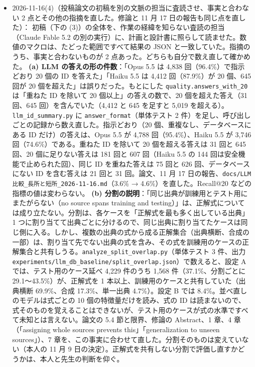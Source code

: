 \documentclass[11pt,a4paper]{jsarticle}
\begin{document}
\begin{itemize}[nosep]
  \item 2026-11-16(4)（投稿論文の初稿を別の文脈の担当に査読させ、事実と合わない 2 点とその他の指摘を直した。修論と 11 月 17 日の報告も同じ点を直した）：
    初稿（下の (3)）の全体を、作業の経緯を知らない査読の担当（Claude Fable 5.2 の別の実行）に、計画と設計書に照らして読ませた。数値のマクロは、たどった範囲ですべて結果の JSON と一致していた。指摘のうち、事実と合わないものが 2 点あった。どちらも自分で数え直して確かめた。
    \textbf{(a) LLM の答えの形の件数}：「Opus 5.5 は 4,838 回（96.4\%）で指示どおり 20 個の ID を答えた」「Haiku 5.5 は 4,412 回（87.9\%）が 20 個、645 回が 20 個を超えた」は誤りだった。もとにした \texttt{quality.answers\_with\_20} は「重ねた ID を除いて 20 個以上」の答えの数で、20 個を超えた答え（31 回、645 回）を含んでいた（4,412 と 645 を足すと 5,019 を超える）。\texttt{llm\_id\_summary.py} に \texttt{answer\_format}（単体テスト 2 件）を足し、呼び出しごとの記録から数え直した。指示どおり（20 個、重複なし、データベースにある ID だけ）の答えは、Opus 5.5 が 4,788 回（95.4\%）、Haiku 5.5 が 3,746 回（74.6\%）である。重ねた ID を除いて 20 個を超える答えは 31 回と 645 回、20 個に足りない答えは 181 回と 607 回（Haiku 5.5 の 144 回は安全機能で止められた回）、同じ ID を重ねた答えは 75 回と 626 回、データベースにない ID を含む答えは 21 回と 31 回。論文、11 月 17 日の報告、\texttt{docs/LLM比較\_長所と短所\_2026-11-16.md}（3.6\% → 4.6\%）を直した。Recall@20 などの指標の値は変わらない。
    \textbf{(b) 分割の説明}：「同じ出典が訓練用とテスト用にまたがらない（no source spans training and testing）」は、正解式については成り立たない。分割は、各ケースを「正解式を最も多く出している出典」1 つに割り当てて出典ごとに分けるので、同じ出典に割り当てたケースは同じ側に入る。しかし、複数の出典の式から成る正解集合（出典横断、合成の一部）は、割り当て先でない出典の式を含み、その式を訓練用のケースの正解集合と共有しうる。\texttt{analyze\_split\_overlap.py}（単体テスト 3 件、出力 \texttt{experiments/llm\_db\_baseline/split\_overlap.json}）で数えると、設定 A では、テスト用のケース延べ 4,229 件のうち 1,568 件（37.1\%、分割ごとに 29.1〜43.5\%）が、正解式を 1 本以上、訓練用のケースと共有していた（出典横断 69.9\%、合成 17.3\%、単一出典 4.7\%）。設定 B では 8.4\%。並べ直しのモデルは式ごとの 10 個の特徴量だけを読み、式の ID は読まないので、式そのものを覚えることはできないが、テスト用のケースが式の水準ですべて未知とは言えない。論文の 5.4 節と限界、修論の Abstract、1 章、4 章（「assigning whole sources prevents this」「generalization to unseen sources」）、7 章を、この事実に合わせて直した。分割そのものは変えていない（本人の 11 月 9 日の決定）。正解式を共有しない分割で評価し直すかどうかは、本人と先生の判断を仰ぐ。

\end{itemize}
\end{document}
